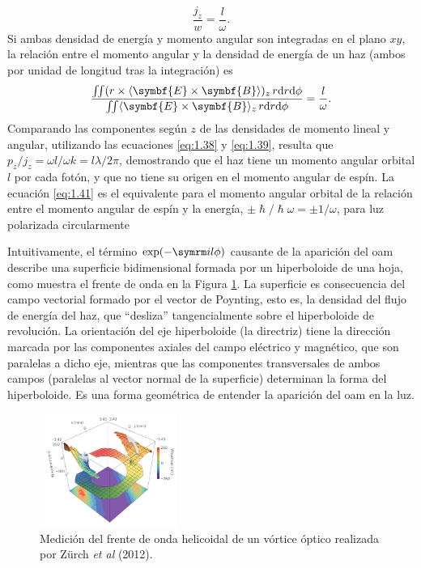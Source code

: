\begin{equation}\label{eq:.1.40}
  \frac{j_{z}}{w} = \frac{l}{\omega}.
\end{equation}
Si ambas densidad de energía y momento angular son integradas en el plano $xy$, la relación entre el momento angular y la densidad de energía de un haz (ambos por unidad de longitud tras la integración) es
\begin{equation}\label{eq:1.41}
  \frac{\iint(r \times \xval{\symbf{E}\times \symbf{B}})_{z}\, r\!\diff r\!\diff \phi}{\iint \xval{\symbf{E}\times \symbf{B}}_{z}\, r\!\diff r\!\diff \phi} = \frac{l}{\omega}.
\end{equation}
Comparando las componentes según $z$ de las densidades de momento lineal y angular, utilizando las ecuaciones \eqref{eq:1.38} y \eqref{eq:1.39}, resulta que $p_{z}/j_{z}=\omega l /\omega k = l \lambda/2 \pi$, demostrando que el haz tiene un momento angular orbital $l$ por cada fotón, y que no tiene su origen en el momento angular de espín. La ecuación \eqref{eq:1.41} es el equivalente para el momento angular orbital de la relación entre el momento angular de espín y la energía, $\pm \hslash /\hslash \omega = \pm 1/\omega$, para luz polarizada circularmente

Intuitivamente, el término $\exp(- \iu l \phi)$ causante de la aparición del \acrshort{oam} describe una superficie bidimensional formada por un hiperboloide de una hoja, como muestra el frente de onda en la Figura \ref{fig:1.15}. La superficie es consecuencia del campo vectorial formado por el vector de Poynting, esto es, la densidad del flujo de energía del haz, que \enquote{desliza} tangencialmente sobre el hiperboloide de revolución. La orientación del eje hiperboloide (la directriz) tiene la dirección marcada por las componentes axiales del campo eléctrico y magnético, que son paralelas a dicho eje, mientras que las componentes transversales de ambos campos (paralelas al vector normal de la superficie) determinan la forma del hiperboloide. Es una forma geométrica de entender la aparición del \acrshort{oam} en la luz.

\begin{figure}[htbp]
  \centering
  \includegraphics[width=0.4\textwidth]{Figuras/ch1_helicoidal.png}
  \caption{Medición del frente de onda helicoidal de un vórtice óptico realizada por Zürch \emph{et al} (2012)\autocite{Zurch2012}.}
  \label{fig:1.15}
\end{figure}

